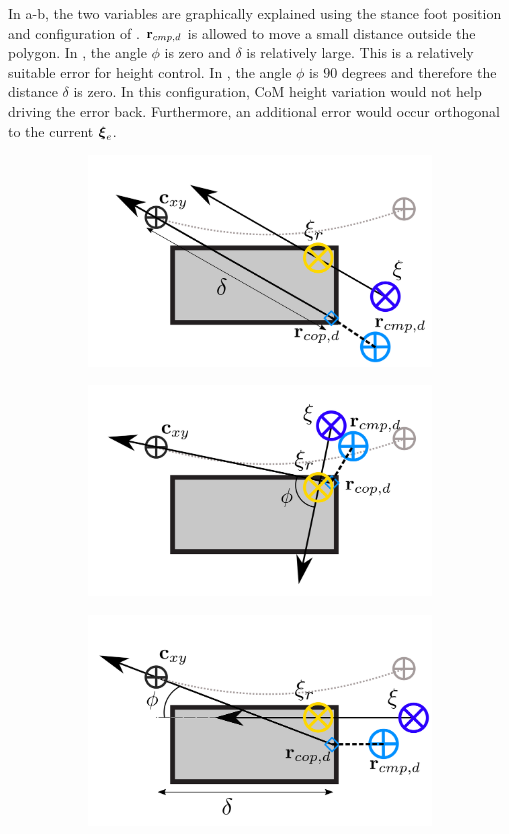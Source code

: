 In a-b, the two variables are graphically explained using the stance foot position and configuration of . $\mathbf{r}_{cmp,d}$ is allowed to move a small distance outside the polygon. In , the angle $\phi$ is zero and $\delta$ is relatively large. This is a relatively suitable error for height control. In , the angle $\phi$ is $90$ degrees and therefore the distance $\delta$ is zero. In this configuration, \ac{CoM} height variation would not help driving the error back. Furthermore, an additional error would occur orthogonal to the current $\boldsymbol{\xi}_e$.
\begin{figure}[h]
\centering
  \begin{subfigure}{0.49\textwidth}
    \centering
  \includegraphics[width=.7\linewidth]{STYLESTUFF/ICPplanStartSSPhiViz0.png}
    \caption{}
     \label{fig:phiVizc}
  \end{subfigure}
  \begin{subfigure}{0.49\textwidth}
    \centering
  \includegraphics[width=.7\linewidth]{STYLESTUFF/ICPplanStartSSPhiViz90.png}
    \caption{}
     \label{fig:phiVizd}
  \end{subfigure}
  \begin{subfigure}{0.49\textwidth}
  \centering
  \includegraphics[width=.7\linewidth]{STYLESTUFF/ICPplanStartSSPhiVizNegError.png}

\end{subfigure}
\end{figure}
